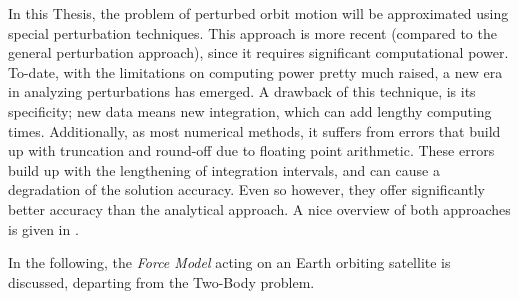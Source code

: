 In this Thesis, the problem of perturbed orbit motion will be approximated 
using special perturbation techniques. This approach is more recent (compared to 
the general perturbation approach), since it requires significant computational 
power. To-date, with the limitations on computing power pretty much raised, a new 
era in analyzing perturbations has emerged. A drawback of this technique, is its 
specificity; new data means new integration, which can add lengthy computing times. 
Additionally, as most numerical methods, it suffers from errors that build up with 
truncation and round-off due to floating point arithmetic. These errors build up 
with the lengthening of integration intervals, and can cause a degradation of the 
solution accuracy. Even so however, they offer significantly better accuracy than 
the analytical approach. A nice overview of both approaches is given in \cite{Vallado2001}.

In the following, the \emph{Force Model} acting on an Earth orbiting satellite 
is discussed, departing from the Two-Body problem.
